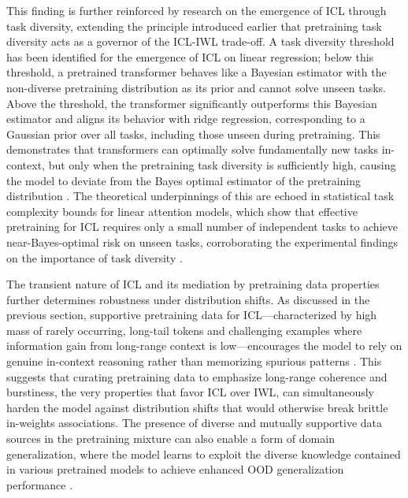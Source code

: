 \documentclass[11pt]{article}
\begin{document}
This finding is further reinforced by research on the emergence of ICL through task diversity, extending the principle introduced earlier that pretraining task diversity acts as a governor of the ICL-IWL trade-off. A task diversity threshold has been identified for the emergence of ICL on linear regression; below this threshold, a pretrained transformer behaves like a Bayesian estimator with the non-diverse pretraining distribution as its prior and cannot solve unseen tasks. Above the threshold, the transformer significantly outperforms this Bayesian estimator and aligns its behavior with ridge regression, corresponding to a Gaussian prior over all tasks, including those unseen during pretraining. This demonstrates that transformers can optimally solve fundamentally new tasks in-context, but only when the pretraining task diversity is sufficiently high, causing the model to deviate from the Bayes optimal estimator of the pretraining distribution \cite{ref48}. The theoretical underpinnings of this are echoed in statistical task complexity bounds for linear attention models, which show that effective pretraining for ICL requires only a small number of independent tasks to achieve near-Bayes-optimal risk on unseen tasks, corroborating the experimental findings on the importance of task diversity \cite{ref49}.

The transient nature of ICL and its mediation by pretraining data properties further determines robustness under distribution shifts. As discussed in the previous section, supportive pretraining data for ICL---characterized by high mass of rarely occurring, long-tail tokens and challenging examples where information gain from long-range context is low---encourages the model to rely on genuine in-context reasoning rather than memorizing spurious patterns \cite{ref41}. This suggests that curating pretraining data to emphasize long-range coherence and burstiness, the very properties that favor ICL over IWL, can simultaneously harden the model against distribution shifts that would otherwise break brittle in-weights associations. The presence of diverse and mutually supportive data sources in the pretraining mixture can also enable a form of domain generalization, where the model learns to exploit the diverse knowledge contained in various pretrained models to achieve enhanced OOD generalization performance \cite{ref118}.
\end{document}
